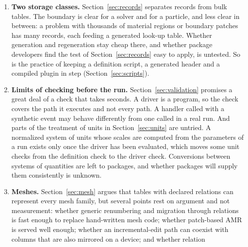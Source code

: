 \documentclass[11pt,a4paper]{article}
\begin{document}
\begin{enumerate}
        run by executing its driver again against a journal.  That depends
        on three things that are untried.  Every command must be classed
        correctly as changing the database or changing only the process,
        including the commands that packages add.  Users must accept that
        the state of Lua variables does not survive a restart.  And
        packages must keep everything that matters in the store; the
        restart test finds a package that does not, but only for the cases
        the test exercises.
  \item \textbf{Two storage classes.}  Section~\ref{sec:records} separates
        records from bulk tables.  The boundary is clear for a solver and
        for a particle, and less clear in between: a problem with thousands
        of material regions or boundary patches has many records, each
        feeding a generated look-up table.  Whether generation and
        regeneration stay cheap there, and whether package developers find
        the test of Section~\ref{sec:records} easy to apply, is untested.
        So is the practice of keeping a definition script, a generated
        header and a compiled plugin in step (Section~\ref{sec:scripts}).
  \item \textbf{Limits of checking before the run.}
        Section~\ref{sec:validation} promises a great deal of a check that
        takes seconds.  A driver is a program, so the check covers the path
        it executes and not every path.  A handler called with a synthetic
        event may behave differently from one called in a real run.  And parts of the treatment of units in Section~\ref{sec:units} are
        untried.  A normalized system of units whose scales are computed
        from the parameters of a run exists only once the driver has been
        evaluated, which moves some unit checks from the definition check to
        the driver check.  Conversions between systems of quantities are
        left to packages, and whether packages will supply them
        consistently is unknown.
  \item \label{risk:mesh} \textbf{Meshes.}  Section~\ref{sec:mesh} argues
        that tables with declared relations can represent every mesh family,
        but several points rest on argument and not measurement: whether
        generic renumbering and migration through relations is fast enough to
        replace hand-written mesh code; whether patch-based AMR is served
        well enough; whether an incremental-edit path can coexist with
        columns that are also mirrored on a device; and whether relation

\end{enumerate}
\end{document}

